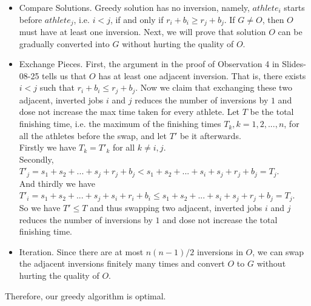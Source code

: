 \documentclass{article}
\begin{document}
\begin{tcolorbox}
\begin{itemize}
\item Compare Solutions. Greedy solution has no inversion, namely, $athlete_i$ starts before $athlete_j$, i.e. $i < j$, if and only if $r_i + b_i \geq r_j + b_j$. If $G \neq O$, then $O$ must have at least one inversion. Next, we will prove that solution $O$ can be gradually converted into $G$ without hurting the quality of $O$.

\item Exchange Pieces. First, the argument in the proof of Observation 4 in Slides-08-25 tells us that $O$ has at least one adjacent inversion. That is, there exists $i < j$ such that $r_i + b_i \leq r_j + b_j$. Now we claim that exchanging these two adjacent, inverted jobs $i$ and $j$ reduces the number of inversions by $1$ and dose not increase the max time taken for every athlete. Let $T$ be the total finishing time, i.e. the maximum of the finishing times $T_k, k = 1, 2, ..., n$, for all the athletes before the swap, and let $T'$ be it afterwards. \\
Firstly we have $T_k = T'_k$ for all $k \neq i, j$. \\
Secondly, $T'_j = s_1 + s_2 + ... + s_j+ r_j + b_j < s_1 + s_2 + ... + s_i + s_j + r_j + b_j = T_j$.\\
And thirdly we have $T'_i = s_1 + s_2 + ... + s_j +s_i + r_i + b_i \leq s_1 + s_2 + ... + s_i + s_j + r_j + b_j = T_j$.\\
So we have $T' \leq T$ and thus swapping two adjacent, inverted jobs $i$ and $j$ reduces the number of inversions by $1$ and dose not increase the total finishing time.  

\item Iteration. Since there are at most $n(n-1)/2$ inversions in $O$, we can swap the adjacent inversions finitely many times and convert $O$ to $G$ without hurting the quality of $O$. 
\end{itemize}
Therefore, our greedy algorithm is optimal.
\end{tcolorbox}
\end{document}
